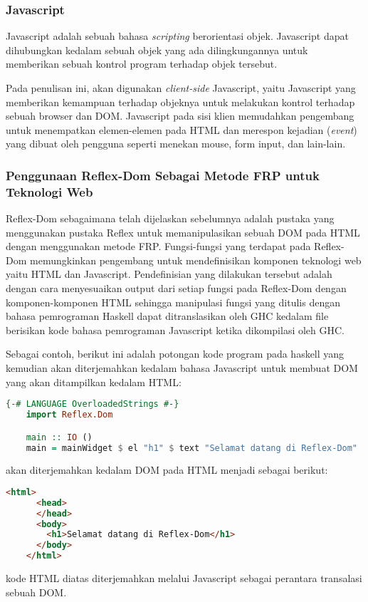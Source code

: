 \documentclass[pi.tex]{subfile}
\begin{document}
\subsubsection{Javascript}

Javascript adalah sebuah bahasa \emph{scripting} berorientasi objek. Javascript dapat dihubungkan kedalam sebuah objek yang ada dilingkungannya untuk memberikan sebuah kontrol program terhadap objek tersebut.

Pada penulisan ini, akan digunakan \emph{client-side} Javascript, yaitu Javascript yang memberikan kemampuan terhadap objeknya untuk melakukan kontrol terhadap sebuah browser dan DOM. Javascript pada sisi klien memudahkan pengembang untuk menempatkan elemen-elemen pada HTML dan merespon kejadian (\emph{event}) yang dibuat oleh pengguna seperti menekan mouse, form input, dan lain-lain.

\subsubsection{Penggunaan Reflex-Dom Sebagai Metode FRP untuk Teknologi Web}

Reflex-Dom sebagaimana telah dijelaskan sebelumnya adalah pustaka yang menggunakan pustaka Reflex untuk memanipulasikan sebuah DOM pada HTML dengan menggunakan metode FRP. Fungsi-fungsi yang terdapat pada Reflex-Dom memungkinkan pengembang untuk mendefinisikan komponen teknologi web yaitu HTML dan Javascript. Pendefinisian yang dilakukan tersebut adalah dengan cara menyesuaikan output dari setiap fungsi pada Reflex-Dom dengan komponen-komponen HTML sehingga manipulasi fungsi yang ditulis dengan bahasa pemrograman Haskell dapat ditranslasikan oleh GHC kedalam file berisikan kode bahasa pemrograman Javascript ketika dikompilasi oleh GHC.

Sebagai contoh, berikut ini adalah potongan kode program pada haskell yang kemudian akan diterjemahkan kedalam bahasa Javascript untuk membuat DOM yang akan ditampilkan kedalam HTML:\\

  \begin{lstlisting}[language=Haskell]
    {-# LANGUAGE OverloadedStrings #-}
    import Reflex.Dom

    main :: IO ()
    main = mainWidget $ el "h1" $ text "Selamat datang di Reflex-Dom"
  \end{lstlisting}
  akan diterjemahkan kedalam DOM pada HTML menjadi sebagai berikut:
\\
  \begin{lstlisting}[language=HTML]
    <html>
      <head>
      </head>
      <body>
        <h1>Selamat datang di Reflex-Dom</h1>
      </body>
    </html>
  \end{lstlisting}
  kode HTML diatas diterjemahkan melalui Javascript sebagai perantara transalasi sebuah DOM.
\end{document}

